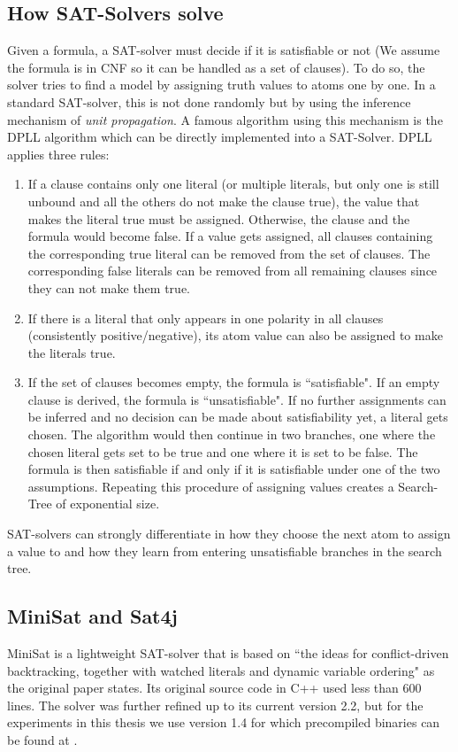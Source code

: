 \subsection{How SAT-Solvers solve}
Given a formula, a SAT-solver must decide if it is satisfiable or not (We assume the formula is in CNF so it can be handled as a set of clauses). To do so, the solver tries to find a model by assigning truth values to atoms one by one. In a standard SAT-solver, this is not done randomly but by using the inference mechanism of \emph{unit propagation}. 
A famous algorithm using this mechanism is the DPLL algorithm\cite{DavisAMachineProgramForTheoremProving1962} which can be directly implemented into a SAT-Solver.
DPLL applies three rules:
\begin{enumerate}
    \item If a clause contains only one literal (or multiple literals, but only one is still unbound and all the others do not make the clause true),  the value that makes the literal true must be assigned. Otherwise, the clause and the formula would become false. If a value gets assigned, all clauses containing the corresponding true literal can be removed from the set of clauses. The corresponding false literals can be removed from all remaining clauses since they can not make them true.
    \item If there is a literal that only appears in one polarity in all clauses (consistently positive/negative), its atom value can also be assigned to make the literals true.
    \item  If the set of clauses becomes empty, the formula is ``satisfiable". If an empty clause is derived, the formula is ``unsatisfiable". If no further assignments can be inferred and no decision can be made about satisfiability yet, a literal gets chosen. The algorithm would then continue in two branches, one where the chosen literal gets set to be true and one where it is set to be false. The formula is then satisfiable if and only if it is satisfiable under one of the two assumptions. Repeating this procedure of assigning values creates a Search-Tree of exponential size.
\end{enumerate}
SAT-solvers can strongly differentiate in how they choose the next atom to assign a value to and how they learn from entering unsatisfiable branches in the search tree.



\subsection{MiniSat and Sat4j}\label{MiniSatAndSat4j}
MiniSat is a lightweight SAT-solver that is based on ``the ideas for conflict-driven backtracking, together with watched literals and dynamic variable ordering" as the original paper \cite{EenAnExtensibleSAT-solver2004} states. Its original source code in C++ used less than 600 lines. The solver was further refined up to its current version 2.2, but for the experiments in this thesis we use version 1.4 for which precompiled binaries can be found at \cite{webMiniSat}.

